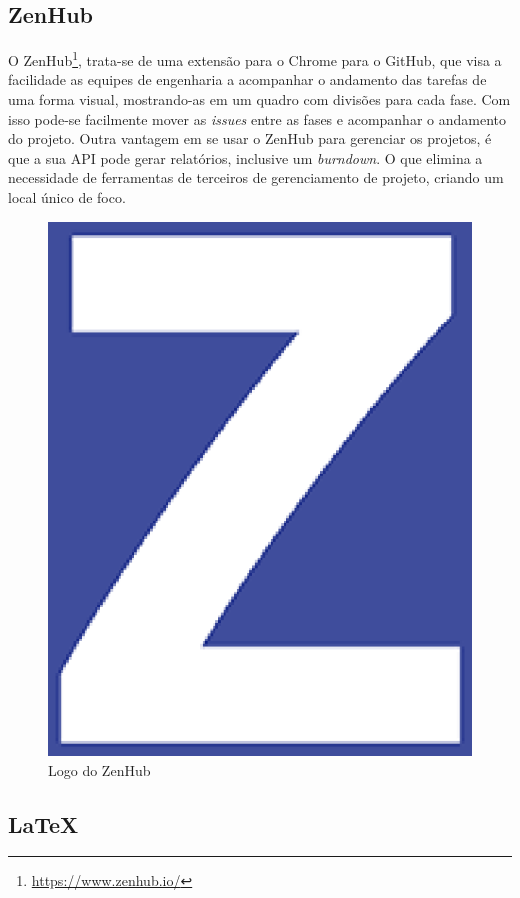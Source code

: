 \subsection{ZenHub}

O ZenHub\footnote{\url{https://www.zenhub.io/}}, trata-se de uma extensão para o Chrome para o GitHub, que visa a facilidade as equipes de engenharia a acompanhar o andamento das tarefas de uma forma visual, mostrando-as em um quadro com divisões para cada fase. Com isso pode-se facilmente mover as \textit{issues} entre as fases e acompanhar o andamento do projeto. Outra vantagem em se usar o ZenHub para gerenciar os projetos, é que a sua API pode gerar relatórios, inclusive um \textit{burndown}. O que elimina a necessidade de ferramentas de terceiros de gerenciamento de projeto, criando um local único de foco.

\begin{figure}[!h]
	\centering
	\includegraphics[scale=0.3]{figuras/capitulo3/zenhub.eps}
	\caption{Logo do ZenHub}
	\label{zenhub}
\end{figure}

\subsection{LaTeX}

